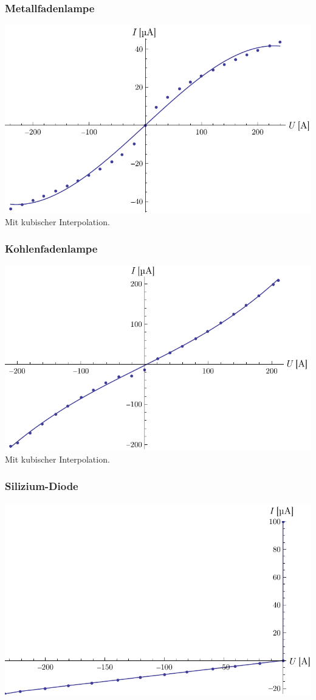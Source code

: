 \documentclass[12pt,a4paper]{article}
\begin{document}
\subsubsection*{Metallfadenlampe}
\includegraphics[width=14cm]{metallfadenlampe.pdf}
Mit kubischer Interpolation.

\subsubsection*{Kohlenfadenlampe}
\includegraphics[width=14cm]{kohlenfadenlampe.pdf}
Mit kubischer Interpolation.

\subsubsection*{Silizium-Diode}
\includegraphics[width=14cm]{siliziumdiode.pdf}
\end{document}
